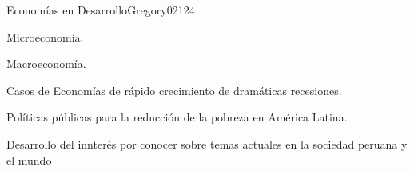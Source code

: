 \begin{syllabus}
\begin{unit}{Economías en Desarrollo}{}{Gregory02}{12}{4}
   \begin{topics}
      \item Microeconomía.
      \item Macroeconomía.
      \item Casos de Economías de rápido crecimiento de dramáticas recesiones.
      \item Políticas públicas para la reducción de la pobreza en América Latina.
   \end{topics}
   \begin{learningoutcomes}
      \item Desarrollo del innterés por conocer sobre temas actuales en la sociedad peruana y el mundo
   \end{learningoutcomes}
\end{unit}

\begin{coursebibliography}
\end{coursebibliography}

\end{syllabus}
